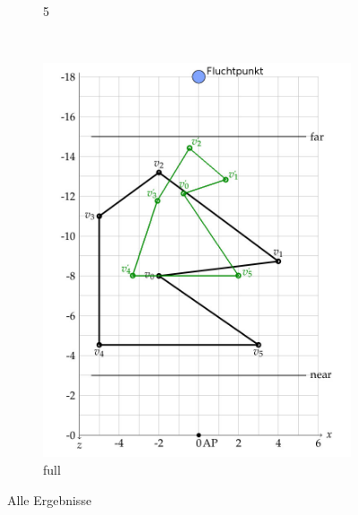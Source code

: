 \documentclass[a4paper,10pt,DIV=14]{article}
\begin{document}
\begin{figure}[H]
\begin{subfigure}{0.3\textwidth}
		\caption{5}
	\end{subfigure}
	~
	\begin{subfigure}{0.3\textwidth}
		\includegraphics[width=\textwidth]{2b_full}
		\caption{full}
	\end{subfigure}
	\caption{Alle Ergebnisse}
\end{figure}
\end{document}
